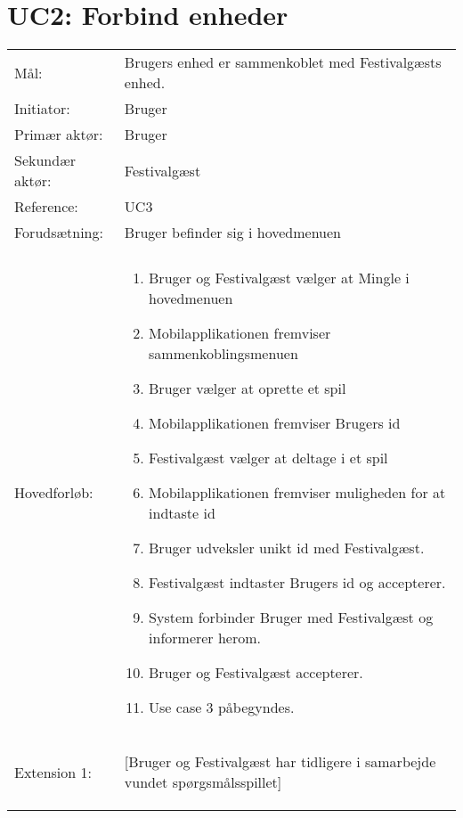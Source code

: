 \section{UC2: Forbind enheder}
\begin{tabular}{ >{\raggedleft} p{3cm} | p{12cm} }
Mål: & Brugers enhed er sammenkoblet med Festivalgæsts enhed. \\
Initiator: & Bruger \\
Primær aktør: & Bruger \\
Sekundær aktør: & Festivalgæst  \\
Reference: & UC3 \\
Forudsætning: & Bruger befinder sig i hovedmenuen
 \\
 & \\
Hovedforløb:  & \begin{enumerate}[label=\arabic*.),itemjoin={\newline},topsep=0pt,partopsep=0pt,itemsep=0pt,leftmargin=*]   
\item Bruger og Festivalgæst vælger at Mingle i hovedmenuen
\item Mobilapplikationen fremviser sammenkoblingsmenuen
\item Bruger vælger at oprette et spil
\item Mobilapplikationen fremviser Brugers id
\item Festivalgæst vælger at deltage i et spil
\item Mobilapplikationen fremviser muligheden for at indtaste id
\item Bruger udveksler unikt id med Festivalgæst. 
\item Festivalgæst indtaster Brugers id og accepterer. 
\item System forbinder Bruger med Festivalgæst og informerer herom.
\item Bruger og Festivalgæst accepterer. \newline
\item Use case 3 påbegyndes.
\end{enumerate}\\
Extension 1: & [Bruger og Festivalgæst har tidligere i samarbejde vundet spørgsmålsspillet]
\vspace{2 mm}
\begin{enumerate}[label=\arabic*.),itemjoin={\newline},topsep=0pt,partopsep=0pt,itemsep=0pt,leftmargin=*]   

\end{enumerate}
\end{tabular}
